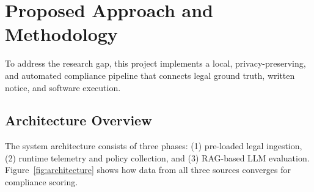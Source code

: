 \documentclass[11pt,a4paper]{article}
\begin{document}
\section{Proposed Approach and Methodology}
To address the research gap, this project implements a local, privacy-preserving, and automated compliance pipeline that connects legal ground truth, written notice, and software execution.

\subsection{Architecture Overview}
The system architecture consists of three phases: (1) pre-loaded legal ingestion, (2) runtime telemetry and policy collection, and (3) RAG-based LLM evaluation. Figure~\ref{fig:architecture} shows how data from all three sources converges for compliance scoring.
\end{document}

